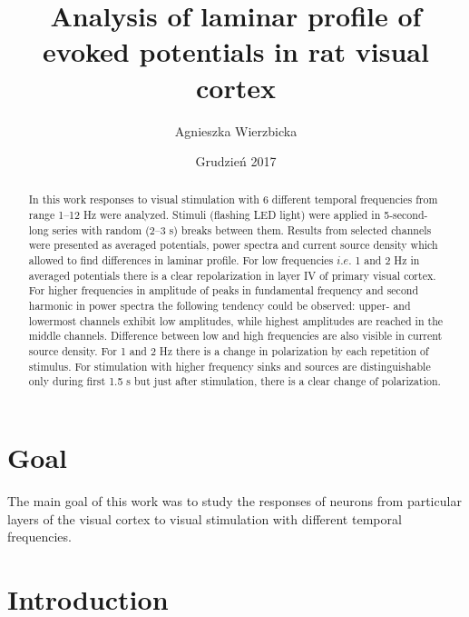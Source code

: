 \documentclass{pracalicmgr}
\author{Agnieszka Wierzbicka}
\title{Analysis of laminar profile of evoked potentials in rat visual cortex}
\date{Grudzień 2017}
\begin{document}
    \maketitle
    \let\cleardoublepage\clearpage
    
    \begin{abstract}
    In this work responses to visual stimulation with 6 different temporal frequencies from range 1--12 Hz were analyzed. Stimuli (flashing LED light) were applied in 5-second-long series with random (2--3 s) breaks between them. Results from selected channels were presented as averaged potentials, power spectra and current source density which allowed to find differences in laminar profile. For low frequencies $i.e.$ 1 and 2 Hz in averaged potentials there is a clear repolarization in layer IV of primary visual cortex. For higher frequencies in amplitude of  peaks in fundamental frequency and second harmonic in power spectra the following tendency could be observed: upper- and lowermost channels exhibit low amplitudes, while highest amplitudes are reached in the middle channels. Difference between low and high frequencies are also visible in current source density. For 1 and 2 Hz there is a change in polarization by each repetition of stimulus. For stimulation with higher frequency sinks and sources are distinguishable only during first 1.5 s but just after  stimulation, there is a clear change of polarization.

     \end{abstract}

  
    \tableofcontents
    
    \chapter*{Goal}
    The main goal of this work was to study the responses of neurons from particular layers of the visual cortex to visual stimulation with different temporal frequencies.
    
   \chapter{Introduction}
   
\end{document}

